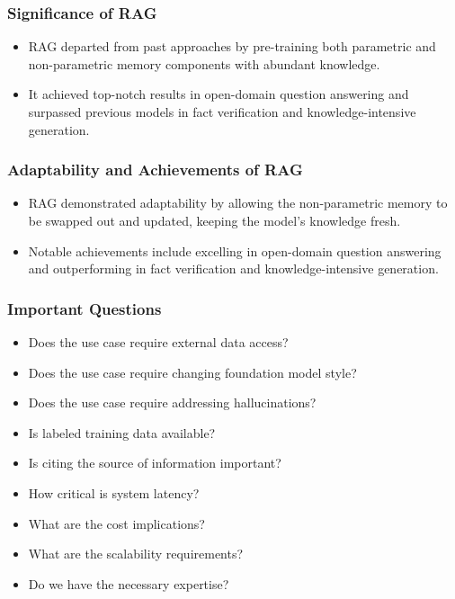 \begin{frame}[fragile]\frametitle{Significance of RAG}
  \begin{itemize}
    \item RAG departed from past approaches by pre-training both parametric and non-parametric memory components with abundant knowledge.
    \item It achieved top-notch results in open-domain question answering and surpassed previous models in fact verification and knowledge-intensive generation.
  \end{itemize}
\end{frame}

\begin{frame}[fragile]\frametitle{Adaptability and Achievements of RAG}
  \begin{itemize}
    \item RAG demonstrated adaptability by allowing the non-parametric memory to be swapped out and updated, keeping the model's knowledge fresh.
    \item Notable achievements include excelling in open-domain question answering and outperforming in fact verification and knowledge-intensive generation.
  \end{itemize}
\end{frame}


\begin{frame}[fragile]\frametitle{Important Questions}
\begin{itemize}
  \item Does the use case require external data access?
  \item Does the use case require changing foundation model style?
  \item Does the use case require addressing hallucinations?
  \item Is labeled training data available?
  \item Is citing the source of information important?
  \item How critical is system latency?
  \item What are the cost implications?
  \item What are the scalability requirements?
  \item Do we have the necessary expertise?
\end{itemize}
\end{frame}




